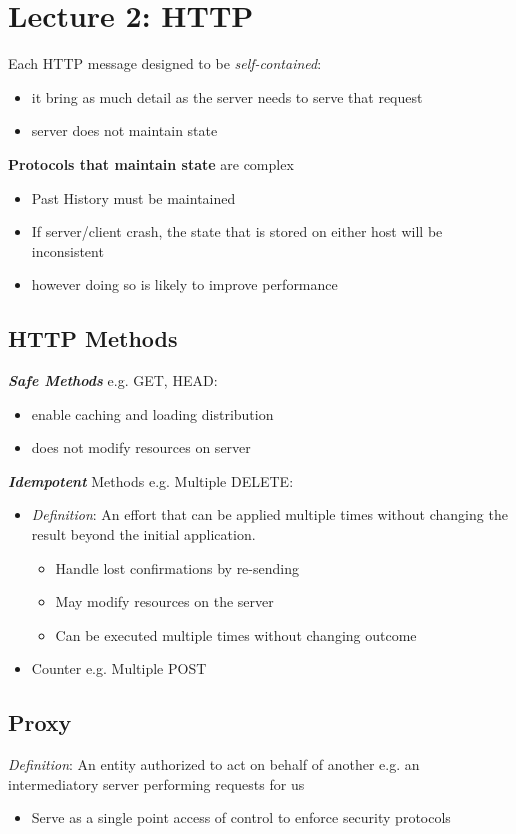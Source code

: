 \documentclass[a4paper]{article}
\begin{document}
\section{Lecture 2: HTTP}
Each HTTP message designed to be \textit{self-contained}:
\begin{itemize}
    \item it bring as much detail as the server needs to serve that request
    \item server does not maintain state
\end{itemize}
\textbf{Protocols that maintain state} are complex
\begin{itemize}
    \item Past History must be maintained
    \item If server/client crash, the state that is stored on either host will be inconsistent
    \item however doing so is likely to improve performance
\end{itemize}

\subsection{HTTP Methods}
\textbf{\textit{Safe Methods}} e.g. GET, HEAD:
\begin{itemize}
    \item enable caching and loading distribution
    \item does not modify resources on server
\end{itemize}
\textbf{\textit{Idempotent}} Methods e.g. Multiple DELETE:
\begin{itemize}
    \item \textit{Definition}: An effort that can be applied multiple times without changing the result beyond the initial application.
    \begin{itemize}[label=$\circ$]
        \item Handle lost confirmations by re-sending
        \item May modify resources on the server
        \item Can be executed multiple times without changing outcome
        \end{itemize}
    \item Counter e.g. Multiple POST
\end{itemize}

\subsection{Proxy}
\textit{Definition}: An entity authorized to act on behalf of another e.g. an intermediatory server performing requests for us
\begin{itemize}
    \item Serve as a single point access of control to enforce security protocols
\end{itemize}
\end{document}
